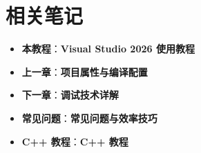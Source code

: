 \section{相关笔记}

\begin{itemize}
  \item \textbf{本教程}：\textbf{Visual Studio 2026 使用教程}
  \item \textbf{上一章}：\textbf{项目属性与编译配置}
  \item \textbf{下一章}：\textbf{调试技术详解}
  \item \textbf{常见问题}：\textbf{常见问题与效率技巧}
  \item \textbf{C++ 教程}：\textbf{C++ 教程}
\end{itemize}
